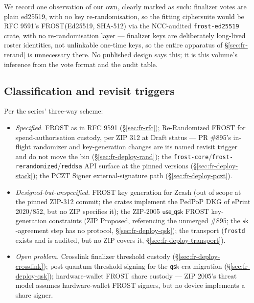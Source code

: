 \documentclass[11pt,a4paper]{article}
\theoremstyle{definition}
\begin{document}
We record one observation of our own, clearly marked as such: finalizer
votes are plain ed25519, with no key re-randomisation, so the fitting
ciphersuite would be RFC 9591's FROST(Ed25519, SHA-512) via the
NCC-audited
\texttt{frost-ed25519} crate, with no re-randomisation layer --- finalizer
keys are deliberately long-lived roster identities, not unlinkable
one-time keys, so the entire apparatus of \S\ref{sec:fr-rerand} is
unnecessary there. No published design says this; it is this volume's
inference from the vote format and the audit table.

\subsection{Classification and revisit triggers}
\label{sec:fr-deploy-class}

Per the series' three-way scheme:

\begin{itemize}
\item \emph{Specified.} FROST as in RFC 9591 (\S\ref{sec:fr-rfc});
  Re-Randomized FROST for spend-authorisation custody, per ZIP 312 at
  Draft status --- PR \#895's in-flight randomizer and key-generation
  changes are its named revisit trigger and do not move the bin
  (\S\ref{sec:fr-deploy-rand}); the
  \texttt{frost-core}/\texttt{frost-rerandomized}/\texttt{reddsa} API
  surface at the pinned versions (\S\ref{sec:fr-deploy-stack}); the PCZT
  Signer external-signature path (\S\ref{sec:fr-deploy-pczt}).
\item \emph{Designed-but-unspecified.} FROST key generation for Zcash
  (out of scope at the pinned ZIP-312 commit; the crates implement the
  PedPoP DKG of ePrint 2020/852, but no ZIP specifies it); the ZIP-2005
  $\mathsf{use\_qsk}$ FROST
  key-generation constraints (ZIP Proposed, referencing the unmerged
  \#895; the $\mathsf{sk}$-agreement step has no protocol,
  \S\ref{sec:fr-deploy-qsk}); the transport
  (\texttt{frostd} exists and is audited, but no ZIP covers it,
  \S\ref{sec:fr-deploy-transport}).
\item \emph{Open problem.} Crosslink finalizer threshold custody
  (\S\ref{sec:fr-deploy-crosslink}); post-quantum threshold signing for
  the $\mathsf{qsk}$-era migration (\S\ref{sec:fr-deploy-qsk});
  hardware-wallet FROST share custody --- ZIP 2005's threat model assumes
  hardware-wallet FROST signers, but no device implements a share signer.
\end{itemize}
\end{document}
